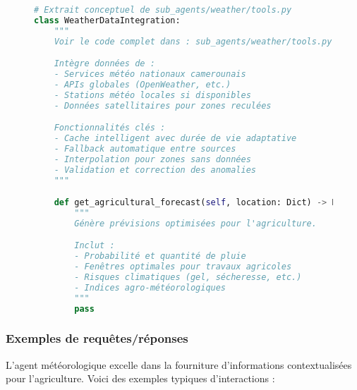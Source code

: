 \begin{figure}[h]
\centering
\begin{lstlisting}[language=Python, caption=Pattern d'intégration météo (exemple simplifié)]
# Extrait conceptuel de sub_agents/weather/tools.py
class WeatherDataIntegration:
    """
    Voir le code complet dans : sub_agents/weather/tools.py

    Intègre données de :
    - Services météo nationaux camerounais
    - APIs globales (OpenWeather, etc.)
    - Stations météo locales si disponibles
    - Données satellitaires pour zones reculées

    Fonctionnalités clés :
    - Cache intelligent avec durée de vie adaptative
    - Fallback automatique entre sources
    - Interpolation pour zones sans données
    - Validation et correction des anomalies
    """

    def get_agricultural_forecast(self, location: Dict) -> Dict:
        """
        Génère prévisions optimisées pour l'agriculture.

        Inclut :
        - Probabilité et quantité de pluie
        - Fenêtres optimales pour travaux agricoles
        - Risques climatiques (gel, sécheresse, etc.)
        - Indices agro-météorologiques
        """
        pass
\end{lstlisting}
\end{figure}

\subsubsection{Exemples de requêtes/réponses}

L'agent météorologique excelle dans la fourniture d'informations contextualisées pour l'agriculture. Voici des exemples typiques d'interactions :

